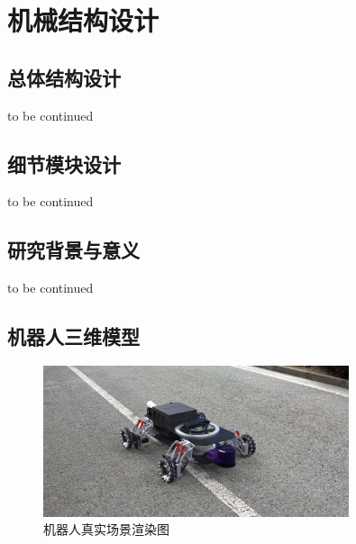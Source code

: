 \newpage

\section{机械结构设计}

\subsection{总体结构设计}

to be continued

\subsection{细节模块设计}

to be continued

\subsection{研究背景与意义}

to be continued

\subsection{机器人三维模型}

\begin{figure}[htbp]
	\centering
	\includegraphics[width = 0.8\textwidth]{fig/jdgonglu.jpg}
	\caption{机器人真实场景渲染图}
	\label{jdgonglu}
\end{figure}


